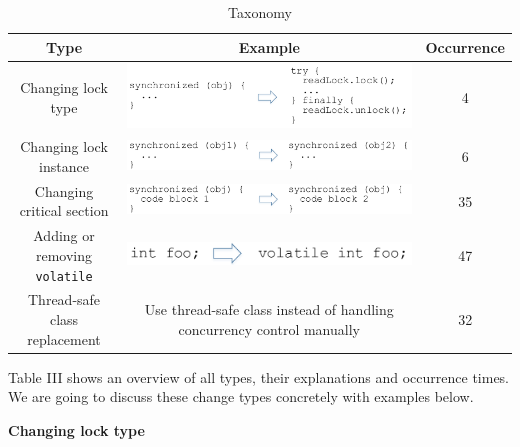 \begin{table}
	\centering
	\caption{Taxonomy}
	\begin{tabular}{|c|c|c|}\hline
		Type&Example&Occurrence\\\hline
		Changing lock type&\includegraphics[scale=0.35]{pattern1}&4\\\hline
		Changing lock instance&\includegraphics[scale=0.35]{pattern2}&6\\\hline
		Changing critical section&\includegraphics[scale=0.35]{pattern3}&35\\\hline
		Adding or removing \texttt{volatile}&\includegraphics[scale=0.35]{pattern4}&47\\\hline
		Thread-safe class replacement&Use thread-safe class instead of handling concurrency control manually&32\\\hline
	\end{tabular}
\end{table}


Table III shows an overview of all types, their explanations and occurrence times. We are going to discuss these change types concretely with examples below.

\textbf{Changing lock type}

